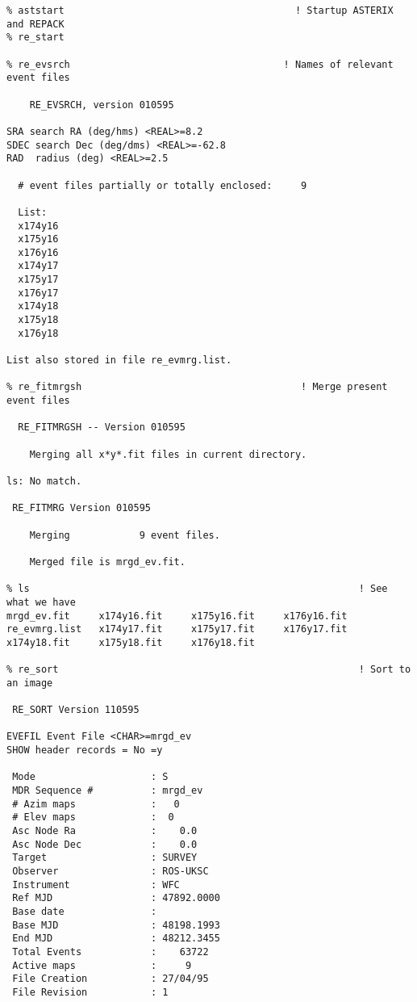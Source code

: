 \begin{small}
\begin{verbatim}
% aststart                                        ! Startup ASTERIX and REPACK
% re_start

% re_evsrch                                     ! Names of relevant event files

    RE_EVSRCH, version 010595

SRA search RA (deg/hms) <REAL>=8.2
SDEC search Dec (deg/dms) <REAL>=-62.8
RAD  radius (deg) <REAL>=2.5

  # event files partially or totally enclosed:     9

  List:
  x174y16
  x175y16
  x176y16
  x174y17
  x175y17
  x176y17
  x174y18
  x175y18
  x176y18

List also stored in file re_evmrg.list.

% re_fitmrgsh                                      ! Merge present event files 
 
  RE_FITMRGSH -- Version 010595
 
    Merging all x*y*.fit files in current directory.
 
ls: No match.
 
 RE_FITMRG Version 010595 

    Merging            9 event files.
 
    Merged file is mrgd_ev.fit.
 
% ls                                                         ! See what we have
mrgd_ev.fit     x174y16.fit     x175y16.fit     x176y16.fit
re_evmrg.list   x174y17.fit     x175y17.fit     x176y17.fit
x174y18.fit     x175y18.fit     x176y18.fit

% re_sort                                                    ! Sort to an image

 RE_SORT Version 110595   

EVEFIL Event File <CHAR>=mrgd_ev
SHOW header records = No =y

 Mode                    : S
 MDR Sequence #          : mrgd_ev   
 # Azim maps             :   0
 # Elev maps             :  0
 Asc Node Ra             :    0.0
 Asc Node Dec            :    0.0
 Target                  : SURVEY                                  
 Observer                : ROS-UKSC                                
 Instrument              : WFC                                     
 Ref MJD                 : 47892.0000
 Base date               : 
 Base MJD                : 48198.1993
 End MJD                 : 48212.3455
 Total Events            :    63722
 Active maps             :     9
 File Creation           : 27/04/95 
 File Revision           : 1   


\end{verbatim}
\end{small}
